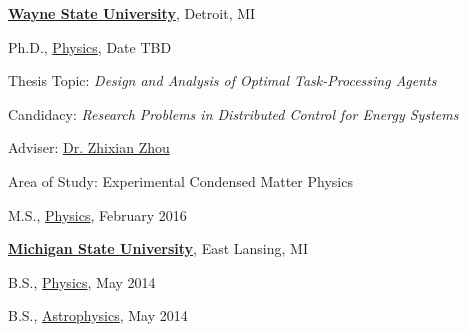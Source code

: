 \documentclass[10pt]{article}
\renewcommand{\section}[1]{\pagebreak[3]%
    \vspace{1.3\baselineskip}%
    \phantomsection\addcontentsline{toc}{section}{#1}%
    \noindent\llap{\scshape\smash{\parbox[t]{\marginparwidth}{\hyphenpenalty=10000\raggedright #1}}}%
    \vspace{-\baselineskip}\par}
\newcommand{\halfblankline}{\quad\vspace{-0.5\baselineskip}\pagebreak[3]}
\begin{document}
\href{http://www.wayne.edu/}{\textbf{Wayne State University}},
Detroit, MI
\begin{outerlist}

\item[] Ph.D.,
        \href{http://physics.clas.wayne.edu/}
             {Physics},
             Date TBD
        \begin{innerlist}
        \item Thesis Topic: \emph{Design and Analysis of Optimal
            Task-Processing Agents}
        \item Candidacy: \emph{Research
            Problems in Distributed Control for Energy Systems}
        \item Adviser:
              \href{http://www.physics.wayne.edu/~zxzhou/}
                   {Dr. Zhixian Zhou}
        \item Area of Study: Experimental Condensed Matter Physics
        \end{innerlist}

\item[] M.S.,
        \href{http://physics.clas.wayne.edu/}
             {Physics}, February 2016
\end{outerlist}

\halfblankline

\href{http://www.msu.edu/}{\textbf{Michigan State University}},
East Lansing, MI
\begin{outerlist}

\item[] B.S.,
        \href{http://www.pa.msu.edu/}
             {Physics}, May 2014

\item[] B.S.,
        \href{http://www.pa.msu.edu/}
             {Astrophysics}, May 2014

\end{outerlist}

%
\end{document}
